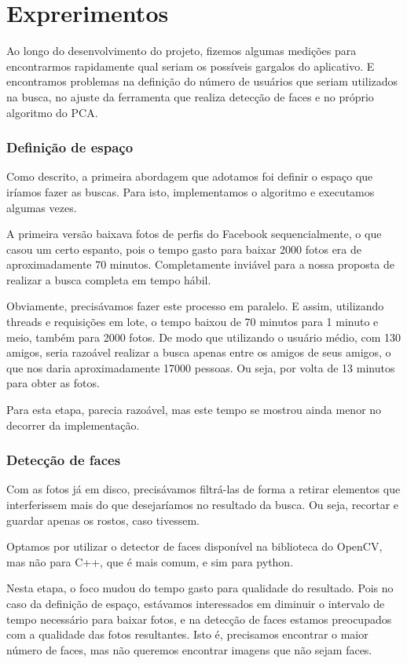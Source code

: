 \documentclass[10pt,a4paper]{article}
\begin{document}
\section{Exprerimentos}
Ao longo do desenvolvimento do projeto, fizemos algumas medições para encontrarmos
rapidamente qual seriam os possíveis gargalos do aplicativo. E
encontramos problemas na definição do número de usuários que seriam
utilizados na busca, no ajuste da ferramenta que realiza detecção de
faces e no próprio algoritmo do PCA.

\subsubsection*{Definição de espaço}

Como descrito, a primeira abordagem que adotamos foi definir o espaço
que iríamos fazer as buscas. Para isto, implementamos o algoritmo e
executamos algumas vezes.

A primeira versão baixava fotos de perfis do Facebook
sequencialmente, o que casou um certo espanto, pois o tempo
gasto para baixar 2000 fotos era de aproximadamente 70
minutos. Completamente inviável para a nossa proposta de
realizar a busca completa em tempo hábil.

Obviamente, precisávamos fazer este processo em paralelo. E
assim, utilizando threads e requisições em lote, o tempo
baixou de 70 minutos para 1 minuto e meio, também para 2000
fotos. De modo que utilizando o usuário médio, com 130 amigos,
seria razoável realizar a busca apenas entre os amigos de seus
amigos, o que nos daria aproximadamente 17000 pessoas. Ou
seja, por volta de 13 minutos para obter as fotos.

Para esta etapa, parecia razoável, mas este tempo se mostrou ainda
menor no decorrer da implementação.

\subsubsection*{Detecção de faces}

Com as fotos já em disco, precisávamos filtrá-las de forma a
retirar elementos que interferissem mais do que desejaríamos
no resultado da busca. Ou seja, recortar e guardar apenas os
rostos, caso tivessem.

Optamos por utilizar o detector de faces disponível na
biblioteca do OpenCV, mas não para C++, que é mais comum, e sim para python.

Nesta etapa, o foco mudou do tempo gasto para qualidade do
resultado. Pois no caso da definição de espaço, estávamos
interessados em diminuir o intervalo de tempo necessário para
baixar fotos, e na detecção de faces estamos preocupados com a
qualidade das fotos resultantes. Isto é, precisamos encontrar
o maior número de faces, mas não queremos encontrar imagens que não sejam faces.
\end{document}
